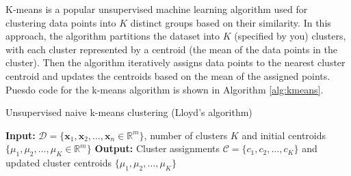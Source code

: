 \documentclass{article}[11pt]
\newcommand{\norm}[1]{\left|\left|#1\right|\right|}
\DeclareMathOperator*{\argmin}{arg\,min}
\begin{document}
K-means is a popular unsupervised machine learning algorithm used for clustering data points into $K$ distinct groups based on their similarity.
In this approach, the algorithm partitions the dataset into $K$ (specified by you) clusters, 
with each cluster represented by a centroid (the mean of the data points in the cluster). 
Then the algorithm iteratively assigns data points to the nearest cluster centroid and updates the centroids 
based on the mean of the assigned points.
Puesdo code for the k-means algorithm is shown in Algorithm \ref{alg:kmeans}.

\begin{algorithm}[H]
   \begin{algorithmic}
   \caption{Unsupervised naive k-means clustering (Lloyd's algorithm)}\label{alg:kmeans}
   \State \textbf{Input:} $\mathcal{D} = \{\mathbf{x}_1, \mathbf{x}_2, \ldots, \mathbf{x}_n\in\mathbb{R}^{m}\}$, number of clusters $K$ and initial centroids $\{\mu_1, \mu_2, \ldots, \mu_K\in\mathbb{R}^{m}\}$
   \State \textbf{Output:} Cluster assignments $\mathcal{C} = \{c_1, c_2, \ldots, c_K\}$ and updated cluster centroids $\{\mu_1, \mu_2, \ldots, \mu_K\}$
      \State{$c_{i}\gets\argmin_{j} \norm{\mathbf{x} - \mu_j}^2$}
   \EndFor 
   \Statex
   \State{$\hat{\mu}\gets\mu$}
   \EndFor
   \Statex
   \If{$\norm{\mu - \hat{\mu}} < \epsilon$}
   \EndIf
   \EndWhile
   \end{algorithmic}
\end{algorithm}
\end{document}
